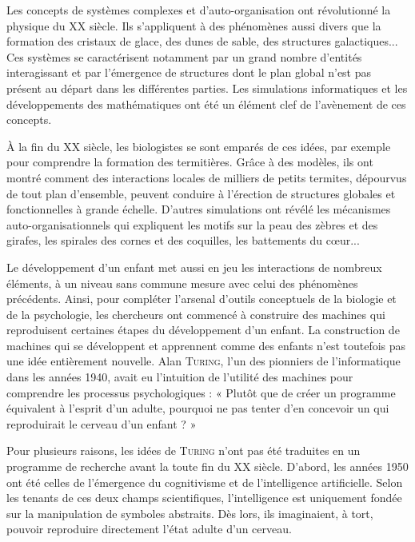 
Les concepts de systèmes complexes et d’auto-organisation ont révolutionné la physique du XX siècle. Ils s’appliquent à des phénomènes aussi divers que la formation des cristaux de glace, des dunes de sable, des structures galactiques... Ces systèmes se caractérisent notamment par un grand nombre d’entités interagissant et par l’émergence de structures dont le plan global n’est pas présent au départ dans les différentes parties. Les simulations informatiques et les développements des mathématiques ont été un élément clef de l’avènement de ces concepts.

À la fin du XX siècle, les biologistes se sont emparés de ces idées, par exemple pour comprendre la formation des termitières. Grâce à des modèles, ils ont montré comment des interactions locales de milliers de petits termites, dépourvus de tout plan d’ensemble, peuvent conduire à l’érection de structures globales et fonctionnelles à grande échelle. D’autres simulations ont révélé les mécanismes auto-organisa\-tionnels qui expliquent les motifs sur la peau des zèbres et des girafes, les spirales des cornes et des coquilles, les battements du cœur...

Le développement d’un enfant met aussi en jeu les interactions de nombreux éléments, à un niveau sans commune mesure avec celui des phénomènes précédents. Ainsi, pour compléter l’arsenal d’outils conceptuels de la biologie et de la psychologie, les chercheurs ont commencé à construire des machines qui reproduisent certaines éta\-pes du développement d’un enfant.
La construction de machines qui se développent et apprennent comme des enfants n’est toutefois pas une idée entièrement nouvelle. Alan \textsc{Turing}, l’un des pionniers de l’informatique dans les années 1940, avait eu l’intuition de l’utilité des machines pour comprendre les processus psychologiques : « Plutôt que de créer un programme équivalent à l’esprit d’un adulte, pourquoi ne pas tenter d’en concevoir un qui reproduirait le cerveau d’un enfant ? »

Pour plusieurs raisons, les idées de \textsc{Turing} n’ont pas été traduites en un programme de recherche avant la toute fin du XX siècle. D’abord, les années 1950 ont été celles de l’émergence du cognitivisme et de l’intelligence artificielle. Selon les tenants de ces deux champs scientifiques, l’intelligence est uniquement fondée sur la manipulation de symboles abstraits. Dès lors, ils imaginaient, à tort, pouvoir reproduire directement l’état adulte d’un cerveau.

